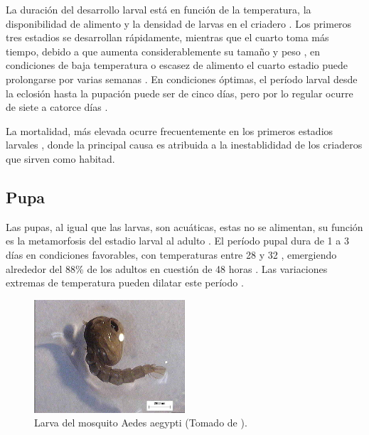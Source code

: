 La duración del desarrollo larval está en función de la temperatura, la disponibilidad de alimento
y la densidad de larvas en el criadero \cite{ThironIzcazaJ2003}. Los primeros tres estadios se
desarrollan rápidamente, mientras que el cuarto toma más tiempo, debido a que aumenta
considerablemente su tamaño y peso \cite{ThironIzcazaJ2003, web-site:gMonteroBiologia},
en condiciones de baja temperatura o escasez de alimento el cuarto estadio puede prolongarse por
varias semanas \cite{ThironIzcazaJ2003}. En condiciones óptimas, el período larval desde la
eclosión hasta la pupación puede ser de cinco días, pero por lo regular ocurre de siete a catorce
días \cite{ThironIzcazaJ2003}.

La mortalidad, más elevada ocurre frecuentemente en los primeros estadios larvales
\cite{ThironIzcazaJ2003}, donde la principal causa es atribuida a la inestablididad de los
criaderos que sirven como habitad.

\subsection{Pupa}
\label{subsec:ciclo-biologico-pupa}
Las pupas, al igual que las larvas, son acuáticas, estas no se alimentan, su función es la
metamorfosis del estadio larval al adulto \cite{ThironIzcazaJ2003}. El período pupal dura de 1
a 3 días en condiciones favorables, con temperaturas entre 28 y 32 \textcelsius
\cite{web-site:gMonteroBiologia}, emergiendo alrededor del 88\% de los adultos en cuestión de 48
horas \cite{ThironIzcazaJ2003}. Las variaciones extremas de temperatura pueden dilatar este período
\cite{web-site:gMonteroBiologia}.

\begin{figure}[!htbp]
\centering
\includegraphics[width=0.5\textwidth]{capitulo-3/graphics/pupa.png}
\caption{\label{fig:cap3-larvas} Larva del mosquito Aedes aegypti (Tomado de
\cite{sivanathan2006ecology}).}
\end{figure}

